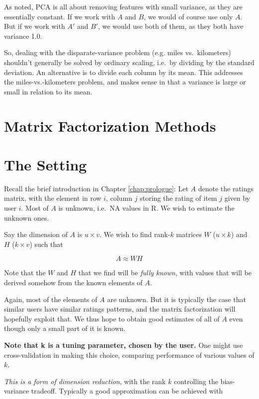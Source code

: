 As noted, PCA is all about removing features with small variance, as
they are essentially constant. If we work with $A$ and $B$, we would of
course use only $A$. But if we work with $A'$ and $B'$, we would use
both of them, as they both have variance 1.0.

So, dealing with the disparate-variance problem (e.g. miles vs.\
kilometers) shouldn't generally be solved by ordinary scaling, i.e.\ by
dividing by the standard deviation.  An alternative is to divide each
column by its mean.  This addresses the miles-vs.-kilometers problem,
and makes sense in that a variance is large or small in relation to its
mean.

\section{Matrix Factorization Methods}  

\section{The Setting}

Recall the brief introduction in Chapter \ref{chap:prologue}:  Let $A$
denote the ratings matrix, with the element in row $i$, column $j$
storing the rating of item $j$ given by user $i$.  Most of $A$ is
unknown, i.e.\ NA values in R.  We wish to estimate the unknown ones.

Say the dimension of $A$ is $u \times v$.  We wish to find rank-$k$
matrices $W$ ($u \times k$) and $H$ ($k \times v$) such that  

\begin{equation}
\label{awh}
A \approx W H
\end{equation}

Note that the $W$ and $H$ that we find will be \textit{fully known},
with values that will be derived somehow from the known elements of $A$.

Again, most of the elements of $A$ are unknown.  But it is typically the
case that similar users have similar ratings patterns, and the matrix
factorization will hopefully exploit that.  We thus hope to obtain good
estimates of all of $A$ even though only a small part of it is known.  

\textbf{Note that k is a tuning parameter, chosen by the user.}  One
might use cross-validation in making this choice, comparing performance
of various values of $k$.

\textit{This is a form of dimension reduction}, with the rank $k$
controlling the bias-variance tradeoff.  Typically a good approximation
can be achieved with

